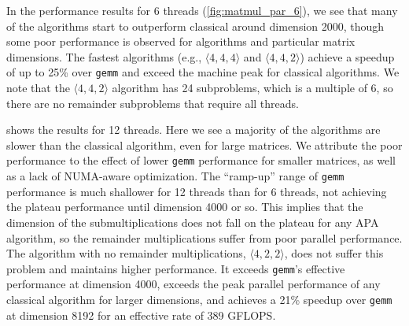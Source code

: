 \documentclass[sigconf,review,anonymous]{acmart}
\newcommand{\dims}[1]{\langle #1 \rangle}
\begin{document}
In the performance results for 6 threads (\cref{fig:matmul_par_6}), we see that many of the algorithms start to outperform classical around dimension 2000, though some poor performance is observed for algorithms and particular matrix dimensions.
The fastest algorithms (e.g., $\dims{4,4,4}$ and $\dims{4,4,2}$) achieve a speedup of up to 25\% over \texttt{gemm} and exceed the machine peak for classical algorithms.
We note that the $\dims{4,4,2}$ algorithm has 24 subproblems, which is a multiple of 6, so there are no remainder subproblems that require all threads.

 shows the results for 12 threads.
Here we see a majority of the algorithms are slower than the classical algorithm, even for large matrices.
We attribute the poor performance to the effect of lower \texttt{gemm} performance for smaller matrices, as well as a lack of NUMA-aware optimization.
The ``ramp-up'' range of \texttt{gemm} performance is much shallower for 12 threads than for 6 threads, not achieving the plateau performance until dimension 4000 or so.
This implies that the dimension of the submultiplications does not fall on the plateau for any APA algorithm, so the remainder multiplications suffer from poor parallel performance.
The algorithm with no remainder multiplications, $\dims{4,2,2}$, does not suffer this problem and maintains higher performance.
It exceeds \texttt{gemm}'s effective performance at dimension 4000, exceeds the peak parallel performance of any classical algorithm for larger dimensions, and achieves a 21\% speedup over \texttt{gemm} at dimension 8192 for an effective rate of 389 GFLOPS.
\end{document}
